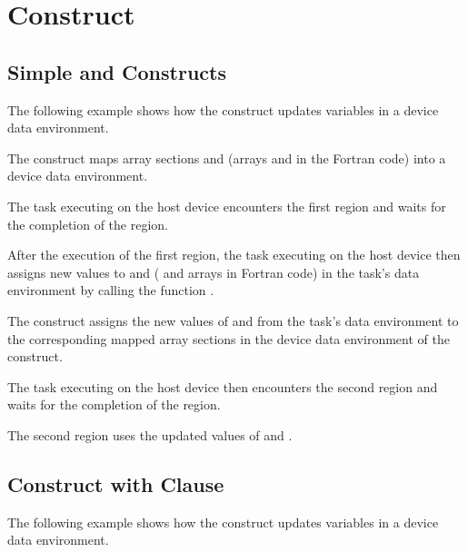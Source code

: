 \pagebreak
\section{  Construct}
\label{sec:target_update}

\subsection{Simple   and   Constructs}
\label{subsec:target_data_and_update}

The following example shows how the   construct updates 
variables in a device data environment.

The   construct maps array sections  and  
(arrays  and  in the Fortran code) into a device data environment.

The task executing on the host device encounters the first  region 
and waits for the completion of the region.

After the execution of the first  region, the task executing on 
the host device then assigns new values to  and  ( and  arrays 
in Fortran code) in the task's data environment by calling the function .

The   construct assigns the new values of  and 
 from the task's data environment to the corresponding mapped array sections 
in the device data environment of the   construct.

The task executing on the host device then encounters the second  
region and waits for the completion of the region.

The second  region uses the updated values of  and .



\subsection{  Construct with  Clause}
\label{subsec:target_update_if}

The following example shows how the   construct updates 
variables in a device data environment.

